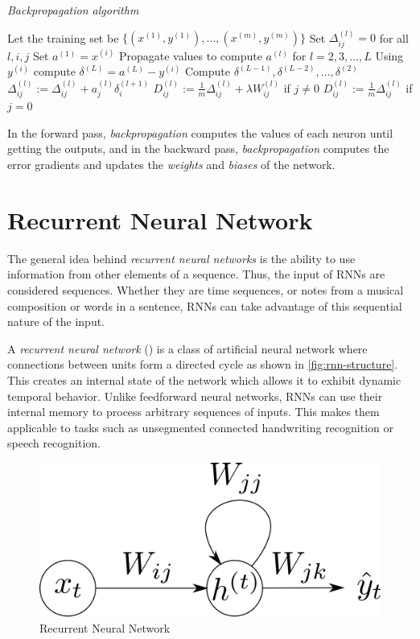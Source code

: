 \begin{algorithm}[H]
  \caption{\textit{Backpropagation algorithm}}
  \label{backpropagation-algorithm}
  \begin{algorithmic}[1]
    \State Let the training set be $\{(x^{(1)},y^{(1)}),\dots,
    (x^{(m)},y^{(m)})\}$
    \State Set $\Delta_{ij}^{(l)} = 0$ for all $l,i,j$
    \State Set $a^{(1)} = x^{(i)}$
    \State Propagate values to compute $a^{(l)}$ for $l = 2,
    3, \dots, L$
    \State Using $y^{(i)}$ compute $\delta^{(L)} = a^{(L)} - y^{(i)}$
    \State Compute $\delta^{(L-1)}, \delta^{(L-2)}, \dots,
    \delta^{(2)}$
    \State $\Delta_{ij}^{(l)} := \Delta_{ij}^{(l)} + a_j^{(l)} \delta_i^{(l+1)}$
    \EndFor
    \State $D_{ij}^{(l)} := \frac{1}{m} \Delta_{ij}^{(l)} + \lambda
    W_{ij}^{(l)}$ if $j \neq 0$
    \State $D_{ij}^{(l)} := \frac{1}{m} \Delta_{ij}^{(l)}$ if $j = 0$
  \end{algorithmic}
\end{algorithm}

In the forward pass, \textit{backpropagation} computes the values of
each neuron until getting the outputs, and in the backward pass,
\textit{backpropagation} computes the error gradients and updates the
\textit{weights} and \textit{biases} of the network.

\section{Recurrent Neural Network}
\label{sec:rnn-nets}

The general idea behind \textit{recurrent neural networks} is the
ability to use information from other elements of a sequence. Thus,
the input of RNNs are considered sequences. Whether they are time
sequences, or notes from a musical composition or words in a sentence,
RNNs can take advantage of this sequential nature of the input.

A \textit{recurrent neural network} (\cite{rumelhart1986sequential})
is a class of artificial neural network where connections between
units form a directed cycle as shown in \autoref{fig:rnn-structure}.
This creates an internal state of the network which allows it to
exhibit dynamic temporal behavior. Unlike feedforward neural networks,
RNNs can use their internal memory to process arbitrary sequences of
inputs. This makes them applicable to tasks such as unsegmented
connected handwriting recognition or speech recognition.

\begin{figure}[bth]
  \centering
  \includegraphics[width=.5\linewidth]{gfx/rnn.png}
  \caption{Recurrent Neural Network}
  \label{fig:rnn-structure}
\end{figure}

